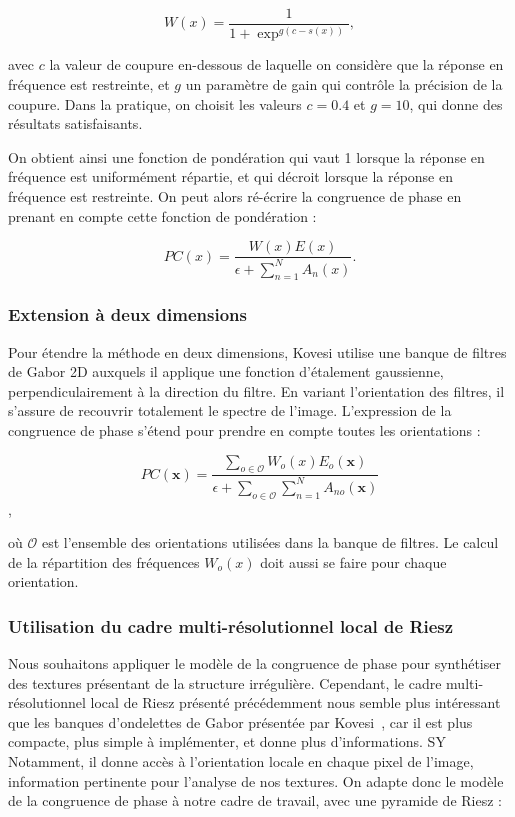 \begin{equation}
    W(x) = \frac{1}{1 + \exp^{g(c-s(x))}},
\end{equation}

avec $c$ la valeur de coupure en-dessous de laquelle on considère que la réponse en fréquence est restreinte, et $g$ un paramètre de gain qui contrôle la précision de la coupure. Dans la pratique, on choisit les valeurs $c = 0.4$ et $g = 10$, qui donne des résultats satisfaisants.

On obtient ainsi une fonction de pondération qui vaut 1 lorsque la réponse en fréquence est uniformément répartie, et qui décroit lorsque la réponse en fréquence est restreinte. On peut alors ré-écrire la congruence de phase en prenant en compte cette fonction de pondération :

\begin{equation}
    PC(x) = \frac{W(x)E(x)}{\epsilon + \sum_{n=1}^{N} A_n(x)}.
\end{equation}

\subsubsection{Extension à deux dimensions}

Pour étendre la méthode en deux dimensions, Kovesi utilise une banque de filtres de Gabor 2D auxquels il applique une fonction d'étalement gaussienne, perpendiculairement à la direction du filtre. En variant l'orientation des filtres, il s'assure de recouvrir totalement le spectre de l'image. L'expression de la congruence de phase s'étend pour prendre en compte toutes les orientations :

\begin{equation}
    PC(\mathbf{x}) = \frac{\sum_{o\in \mathcal{O}} W_o(x)E_o(\mathbf{x})}{\epsilon + \sum_{o \in \mathcal{O}}\sum_{n=1}^{N} A_{no}(\mathbf{x})}
\end{equation},

où $\mathcal{O}$ est l'ensemble des orientations utilisées dans la banque de filtres. Le calcul de la répartition des fréquences $W_o(x)$ doit aussi se faire pour chaque orientation.

\subsubsection{Utilisation du cadre multi-résolutionnel local de Riesz}

Nous souhaitons appliquer le modèle de la congruence de phase pour synthétiser des textures présentant de la structure irrégulière. Cependant, le cadre multi-résolutionnel local de Riesz présenté précédemment nous semble plus intéressant que les banques d'ondelettes de Gabor présentée par Kovesi~\cite{kovesi_image_1995}, car il est plus compacte, plus simple à implémenter, et donne plus d'informations. SY Notamment, il donne accès à l'orientation locale en chaque pixel de l'image, information pertinente pour l'analyse de nos textures. On adapte donc le modèle de la congruence de phase à notre cadre de travail, avec une pyramide de Riesz :

